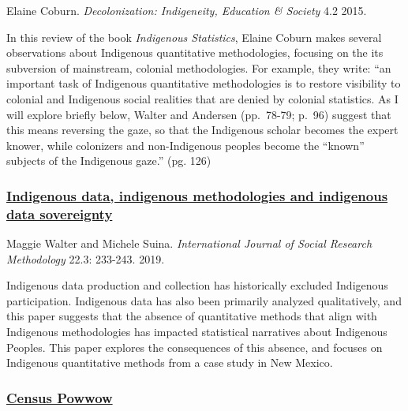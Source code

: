 \documentclass[
]{book}
\begin{document}
Elaine Coburn. \emph{Decolonization: Indigeneity, Education \& Society} 4.2 2015.

In this review of the book \emph{Indigenous Statistics}, Elaine Coburn makes several observations about Indigenous quantitative methodologies, focusing on the its subversion of mainstream, colonial methodologies. For example, they write: ``an important task of Indigenous quantitative methodologies is to restore visibility to colonial and Indigenous social realities that are denied by colonial statistics. As I will explore briefly below, Walter and Andersen (pp.~78-79; p.~96) suggest that this means reversing the gaze, so that the Indigenous scholar becomes the expert knower, while colonizers and non-Indigenous peoples become the ``known'' subjects of the Indigenous gaze.'' (pg. 126)

\hypertarget{indigenous-data-indigenous-methodologies-and-indigenous-data-sovereignty}{%
\subsubsection*{\texorpdfstring{\href{https://www.tandfonline.com/doi/full/10.1080/13645579.2018.1531228}{Indigenous data, indigenous methodologies and indigenous data sovereignty}}{Indigenous data, indigenous methodologies and indigenous data sovereignty}}\label{indigenous-data-indigenous-methodologies-and-indigenous-data-sovereignty}}

Maggie Walter and Michele Suina. \emph{International Journal of Social Research Methodology} 22.3: 233-243. 2019.

Indigenous data production and collection has historically excluded Indigenous participation. Indigenous data has also been primarily analyzed qualitatively, and this paper suggests that the absence of quantitative methods that align with Indigenous methodologies has impacted statistical narratives about Indigenous Peoples. This paper explores the consequences of this absence, and focuses on Indigenous quantitative methods from a case study in New Mexico.

\hypertarget{census-powwow}{%
\subsubsection*{\texorpdfstring{\href{https://open.spotify.com/episode/28040mhUkpvUtas8bd6rmE?si=e0j9BvQ5R9m3e0AGbZajSw}{Census Powwow}}{Census Powwow}}\label{census-powwow}}
\end{document}
